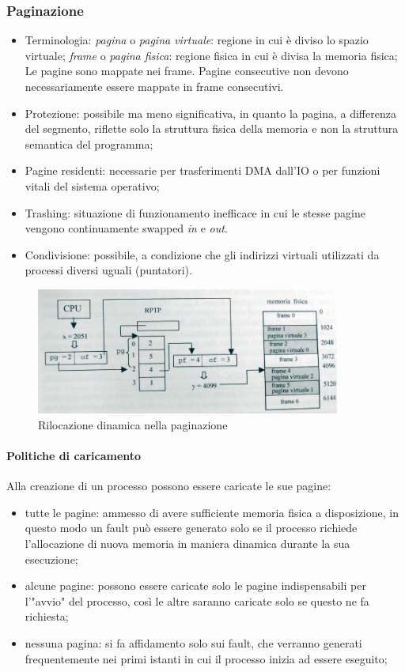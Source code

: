 \documentclass[12pt,a4paper]{article}
\begin{document}
\subsubsection{Paginazione}
\begin{itemize}
  \item Terminologia: \emph{pagina} o \emph{pagina virtuale}: regione
    in cui è diviso lo spazio virtuale; \emph{frame} o \emph{pagina
    fisica}: regione fisica in cui è divisa la memoria fisica;
    Le pagine sono mappate nei frame. Pagine consecutive non
    devono necessariamente essere mappate in frame consecutivi.
  \item Protezione: possibile ma meno significativa, in quanto la
    pagina, a differenza del segmento, riflette solo la struttura
    fisica della memoria e non la struttura semantica del programma;
  \item Pagine residenti: necessarie per trasferimenti DMA dall'IO
    o per funzioni vitali del sistema operativo;
  \item Trashing: situazione di funzionamento inefficace in cui le
    stesse pagine vengono continuamente swapped \emph{in} e
    \emph{out}.
  \item Condivisione: possibile, a condizione che gli indirizzi virtuali
    utilizzati da processi diversi uguali (puntatori).
\end{itemize}

\begin{figure}[H]
\centering
\includegraphics[width=10cm]{img/mem/trad-paginazione.png}
\caption{Rilocazione dinamica nella paginazione}
\end{figure}

\paragraph{Politiche di caricamento}
Alla creazione di un processo possono essere caricate le sue pagine:
\begin{itemize}
  \item tutte le pagine: ammesso di avere sufficiente memoria
    fisica a disposizione, in questo modo un fault può essere
    generato solo se il processo richiede l'allocazione di nuova
    memoria in maniera dinamica durante la sua esecuzione;
  \item alcune pagine: possono essere caricate solo le pagine
    indispensabili per l'"avvio" del processo, così le altre
    saranno caricate solo se questo ne fa richiesta;
  \item nessuna pagina: si fa affidamento solo sui fault, che
    verranno generati frequentemente nei primi istanti in cui
    il processo inizia ad essere eseguito;
\end{itemize}
\end{document}

